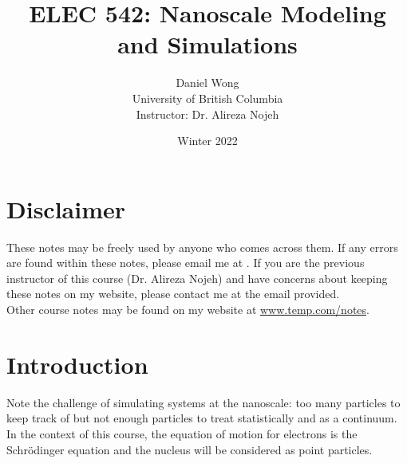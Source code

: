 \documentclass[12pt,a4paper,titlepage]{article}
\newcommand{\ul}[1]{\underline{\smash{#1}}} %
\begin{document}
\title{ELEC 542: Nanoscale Modeling and Simulations}
\author{Daniel Wong\\University of British Columbia\\Instructor: Dr. Alireza Nojeh}
\date{Winter 2022}
\maketitle

\setlength\parindent{0pt}

\section*{Disclaimer}
These notes may be freely used by anyone who comes across them. If any errors are found within these notes, please email me at \ul{temp@temp.com}. If you are the previous instructor of this course (Dr. Alireza Nojeh) and have concerns about keeping these notes on my website, please contact me at the email provided.\\

Other course notes may be found on my website at \url{www.temp.com/notes}.

\newpage
\tableofcontents
\newpage
{}

\section{Introduction}
Note the challenge of simulating systems at the nanoscale: too many particles to keep track of but not enough particles to treat statistically and as a continuum.\\

In the context of this course, the equation of motion for electrons is the Schr\"{o}dinger equation and the nucleus will be considered as point particles.\\
\end{document}
